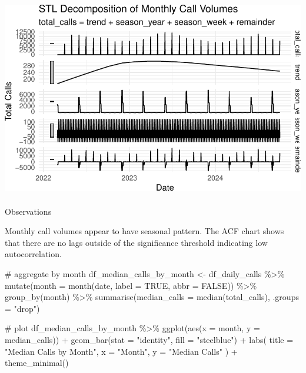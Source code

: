 \documentclass[
  letterpaper,
  DIV=11,
  numbers=noendperiod]{scrartcl}
\makeatletter
\let\oldparagraph\paragraph
\renewcommand{\paragraph}{
    \@ifstar
      \xxxParagraphStar
      \xxxParagraphNoStar
  }
\newcommand{\xxxParagraphStar}[1]{\oldparagraph*{#1}\mbox{}}
\newcommand{\xxxParagraphNoStar}[1]{\oldparagraph{#1}\mbox{}}
\newenvironment{Shaded}{\begin{snugshade}}{\end{snugshade}}
\newcommand{\AttributeTok}[1]{\textcolor[rgb]{0.40,0.45,0.13}{#1}}
\newcommand{\CommentTok}[1]{\textcolor[rgb]{0.37,0.37,0.37}{#1}}
\newcommand{\ConstantTok}[1]{\textcolor[rgb]{0.56,0.35,0.01}{#1}}
\newcommand{\FunctionTok}[1]{\textcolor[rgb]{0.28,0.35,0.67}{#1}}
\newcommand{\NormalTok}[1]{\textcolor[rgb]{0.00,0.23,0.31}{#1}}
\newcommand{\OtherTok}[1]{\textcolor[rgb]{0.00,0.23,0.31}{#1}}
\newcommand{\SpecialCharTok}[1]{\textcolor[rgb]{0.37,0.37,0.37}{#1}}
\newcommand{\StringTok}[1]{\textcolor[rgb]{0.13,0.47,0.30}{#1}}
\makeatother
\begin{document}
\includegraphics{final_proj_group1_files/figure-pdf/unnamed-chunk-1-3.pdf}

\paragraph{Observations}\label{observations-7}

Monthly call volumes appear to have seasonal pattern. The ACF chart
shows that there are no lags outside of the significance threshold
indicating low autocorrelation.

\begin{Shaded}
\begin{Highlighting}[]
\CommentTok{\# aggregate by month}
\NormalTok{df\_median\_calls\_by\_month }\OtherTok{\textless{}{-}}\NormalTok{ df\_daily\_calls }\SpecialCharTok{\%\textgreater{}\%}
  \FunctionTok{mutate}\NormalTok{(}\AttributeTok{month =} \FunctionTok{month}\NormalTok{(date, }\AttributeTok{label =} \ConstantTok{TRUE}\NormalTok{, }\AttributeTok{abbr =} \ConstantTok{FALSE}\NormalTok{)) }\SpecialCharTok{\%\textgreater{}\%}
  \FunctionTok{group\_by}\NormalTok{(month) }\SpecialCharTok{\%\textgreater{}\%}
  \FunctionTok{summarise}\NormalTok{(}\AttributeTok{median\_calls =} \FunctionTok{median}\NormalTok{(total\_calls), }\AttributeTok{.groups =} \StringTok{"drop"}\NormalTok{)}

\CommentTok{\# plot }
\NormalTok{df\_median\_calls\_by\_month }\SpecialCharTok{\%\textgreater{}\%}
  \FunctionTok{ggplot}\NormalTok{(}\FunctionTok{aes}\NormalTok{(}\AttributeTok{x =}\NormalTok{ month, }\AttributeTok{y =}\NormalTok{ median\_calls)) }\SpecialCharTok{+} 
  \FunctionTok{geom\_bar}\NormalTok{(}\AttributeTok{stat =} \StringTok{"identity"}\NormalTok{, }\AttributeTok{fill =} \StringTok{"steelblue"}\NormalTok{) }\SpecialCharTok{+}
  \FunctionTok{labs}\NormalTok{(}
    \AttributeTok{title =} \StringTok{"Median Calls by Month"}\NormalTok{, }
    \AttributeTok{x =} \StringTok{"Month"}\NormalTok{, }
    \AttributeTok{y =} \StringTok{"Median Calls"}
\NormalTok{  ) }\SpecialCharTok{+} \FunctionTok{theme\_minimal}\NormalTok{()}
\end{Highlighting}
\end{Shaded}
\end{document}

